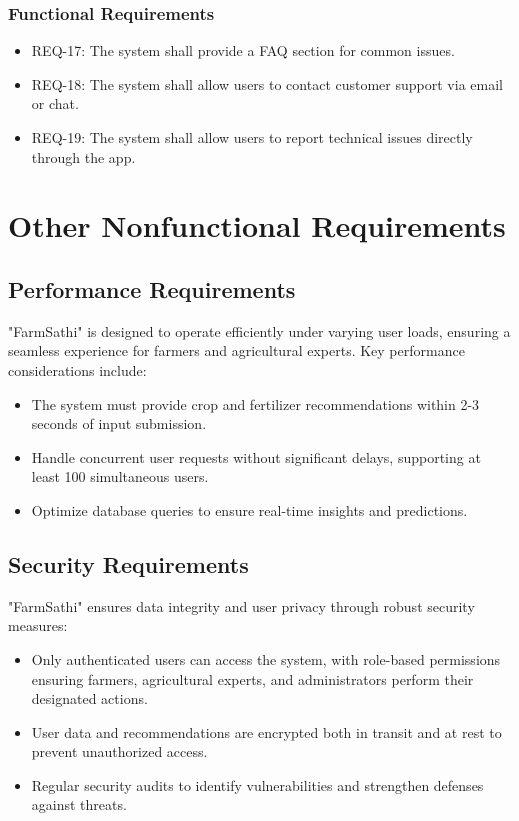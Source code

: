 \documentclass{scrreprt}
\begin{document}
\subsection{Functional Requirements}
\begin{itemize}
    \item REQ-17: The system shall provide a FAQ section for common issues.
    \item REQ-18: The system shall allow users to contact customer support via email or chat.
    \item REQ-19: The system shall allow users to report technical issues directly through the app.
\end{itemize}

\chapter{Other Nonfunctional Requirements}

\section{Performance Requirements}
"FarmSathi" is designed to operate efficiently under varying user loads, ensuring a seamless experience for farmers and agricultural experts. Key performance considerations include:
\begin{itemize}
    \item The system must provide crop and fertilizer recommendations within 2-3 seconds of input submission.
    \item Handle concurrent user requests without significant delays, supporting at least 100 simultaneous users.
    \item Optimize database queries to ensure real-time insights and predictions.
\end{itemize}

\section{Security Requirements}
"FarmSathi" ensures data integrity and user privacy through robust security measures:
\begin{itemize}
    \item Only authenticated users can access the system, with role-based permissions ensuring farmers, agricultural experts, and administrators perform their designated actions.
    \item User data and recommendations are encrypted both in transit and at rest to prevent unauthorized access.
    \item Regular security audits to identify vulnerabilities and strengthen defenses against threats.
\end{itemize}
\end{document}
